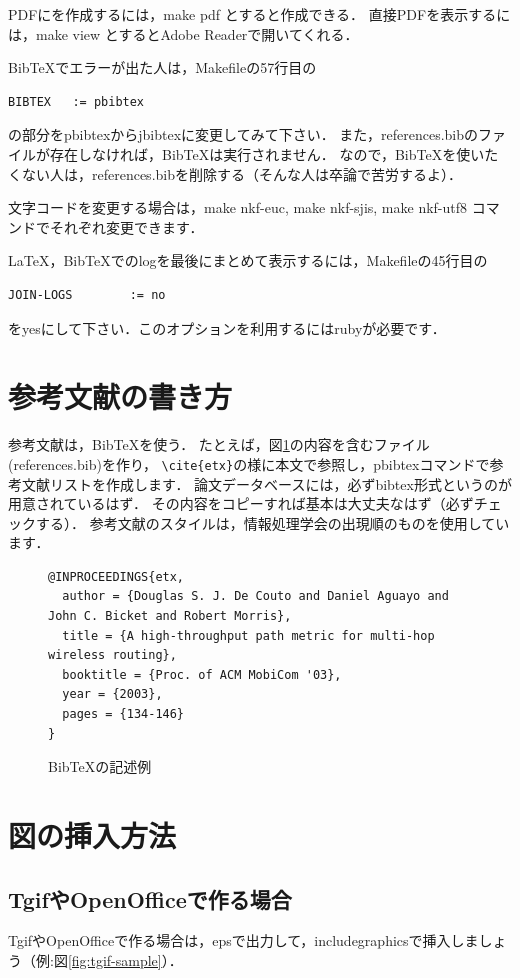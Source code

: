 \documentclass[submit,techreq,noauthor]{eco}	%
\begin{document}
PDFにを作成するには，make pdf とすると作成できる．
直接PDFを表示するには，make view とするとAdobe Readerで開いてくれる．

BibTeXでエラーが出た人は，Makefileの57行目の
\begin{lstlisting}
BIBTEX   := pbibtex
\end{lstlisting}
の部分をpbibtexからjbibtexに変更してみて下さい．
また，references.bibのファイルが存在しなければ，BibTeXは実行されません．
なので，BibTeXを使いたくない人は，references.bibを削除する（そんな人は卒論で苦労するよ）．

文字コードを変更する場合は，make nkf-euc, make nkf-sjis, make nkf-utf8 コマンドでそれぞれ変更できます．

LaTeX，BibTeXでのlogを最後にまとめて表示するには，Makefileの45行目の
\begin{lstlisting}
JOIN-LOGS        := no
\end{lstlisting}
をyesにして下さい．このオプションを利用するにはrubyが必要です．


\section{参考文献の書き方}
参考文献は，BibTeXを使う．
たとえば，図\ref{fig:bibsample}の内容を含むファイル(references.bib)を作り，
\verb|\cite{etx}|の様に本文で参照\cite{etx}し，pbibtexコマンドで参考文献リストを作成します．
論文データベースには，必ずbibtex形式というのが用意されているはず．
その内容をコピーすれば基本は大丈夫なはず（必ずチェックする）．
参考文献のスタイルは，情報処理学会の出現順のものを使用しています．

\begin{figure}[t]
	\begin{lstlisting}
@INPROCEEDINGS{etx,
  author = {Douglas S. J. De Couto and Daniel Aguayo and John C. Bicket and Robert Morris},
  title = {A high-throughput path metric for multi-hop wireless routing},
  booktitle = {Proc. of ACM MobiCom '03},
  year = {2003},
  pages = {134-146}
}
    \end{lstlisting}
	\vspace{-2mm}
	\caption{BibTeXの記述例}
	\label{fig:bibsample}
\end{figure}



\section{図の挿入方法}
\subsection{TgifやOpenOfficeで作る場合}
TgifやOpenOfficeで作る場合は，epsで出力して，includegraphicsで挿入しましょう（例:図\ref{fig:tgif-sample}）．
\end{document}
